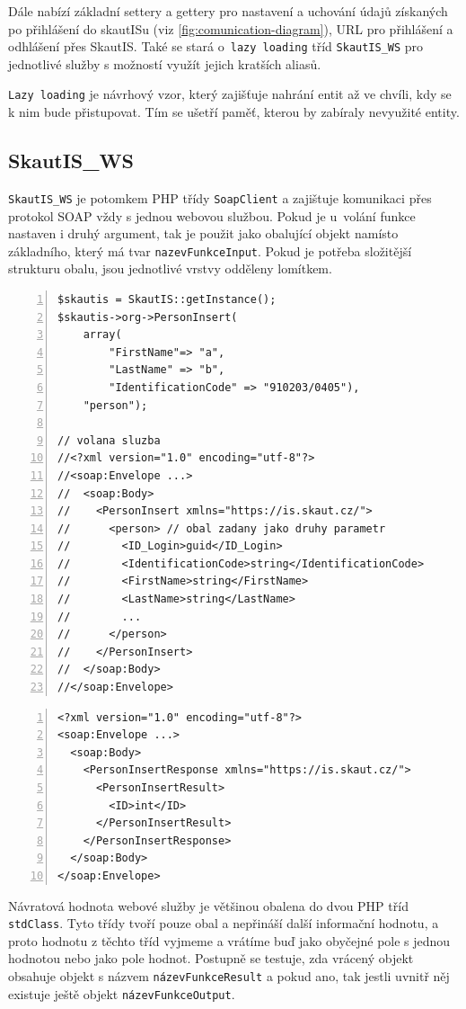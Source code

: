 \documentclass[thesis=B,czech]{FITthesis}[2011/06/14]
\begin{document}
Dále nabízí základní settery a gettery pro nastavení a uchování údajů získaných po přihlášení do skautISu (viz \ref{fig:comunication-diagram}), URL pro přihlášení a odhlášení přes SkautIS. Také se stará o~\texttt{lazy loading} tříd \texttt{SkautIS\_WS} pro jednotlivé služby s možností využít jejich kratších aliasů.

\texttt{Lazy loading} je návrhový vzor, který zajišťuje nahrání entit až ve chvíli, kdy se k nim bude přistupovat. Tím se ušetří paměť, kterou by zabíraly nevyužité entity.

\subsection{SkautIS\_WS}
\texttt{SkautIS\_WS} je potomkem PHP třídy \texttt{SoapClient} a zajištuje komunikaci přes protokol SOAP vždy s jednou webovou službou. Pokud je u~volání funkce nastaven i druhý argument, tak je použit jako obalující objekt namísto základního, který má tvar \texttt{nazevFunkceInput}. Pokud je potřeba složitější strukturu obalu, jsou jednotlivé vrstvy odděleny lomítkem.

\begin{lstlisting}[caption=volání webové služby s nestandardním obalem, label=SkautISAdvanceCover, numbers=left]
$skautis = SkautIS::getInstance();
$skautis->org->PersonInsert(
	array(
		"FirstName"=> "a",
		"LastName" => "b",
		"IdentificationCode" => "910203/0405"),
	"person");

// volana sluzba
//<?xml version="1.0" encoding="utf-8"?>
//<soap:Envelope ...>
//  <soap:Body>
//    <PersonInsert xmlns="https://is.skaut.cz/">
//      <person> // obal zadany jako druhy parametr
//        <ID_Login>guid</ID_Login>
//        <IdentificationCode>string</IdentificationCode>
//        <FirstName>string</FirstName>
//        <LastName>string</LastName>
//        ...
//      </person>
//    </PersonInsert>
//  </soap:Body>
//</soap:Envelope>	
\end{lstlisting}


\begin{lstlisting}[caption=návratová hodnota webové služby, numbers=left]
<?xml version="1.0" encoding="utf-8"?>
<soap:Envelope ...>
  <soap:Body>
    <PersonInsertResponse xmlns="https://is.skaut.cz/">
      <PersonInsertResult>
        <ID>int</ID>
      </PersonInsertResult>
    </PersonInsertResponse>
  </soap:Body>
</soap:Envelope>
\end{lstlisting}

Návratová hodnota webové služby je většinou obalena do dvou PHP tříd \texttt{stdClass}. Tyto třídy tvoří pouze obal a nepřináší další informační hodnotu, a proto hodnotu z těchto tříd vyjmeme a vrátíme buď jako obyčejné pole s jednou hodnotou nebo jako pole hodnot. Postupně se testuje, zda vrácený objekt obsahuje objekt s názvem \texttt{názevFunkceResult} a pokud ano, tak jestli uvnitř něj existuje ještě objekt \texttt{názevFunkceOutput}.
\end{document}
